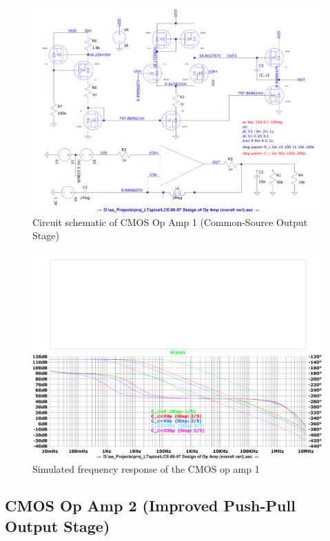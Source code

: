 \documentclass[UTF8]{article}
\begin{document}
\begin{figure}[H]\centering
    \includegraphics[width=\columnwidth]{assets/op amp 1/CMOS op amp 1 (CS).pdf}
    \caption{Circuit schematic of CMOS Op Amp 1 (Common-Source Output Stage)}
    \label{fig: CMOS Op Amp 1}
\end{figure}

\begin{figure}[H]\centering
    \includegraphics[width=\columnwidth]{assets/op amp 1/gain of CMOS op amp 1 copy.pdf}
    \caption{Simulated frequency response of the CMOS op amp 1}
\end{figure}

\subsection{CMOS Op Amp 2 (Improved Push-Pull Output Stage) }
\end{document}
